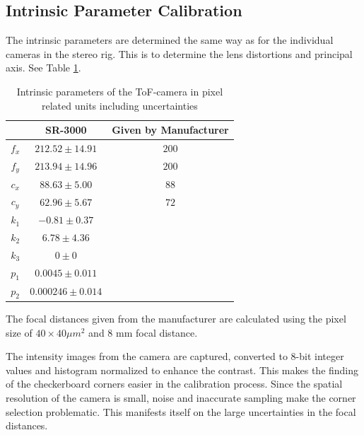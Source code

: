 \subsection{Intrinsic Parameter Calibration}
The intrinsic parameters are determined the same way as for the individual cameras in the
stereo rig. This is to determine the lens distortions and principal axis. See Table
\ref{chap3:tab-intrinsic-sr3000}.
\begin{table}[htbp]
  \centering
    \begin{tabular}{|c|c|c|} 
        \hline
                & SR-3000       & Given by Manufacturer \\
        \hline
        $f_x$   & $212.52 \pm 14.91 $  & $200$  \\
        $f_y$   & $213.94 \pm 14.96 $  & $200$  \\
        \hline
        $c_x$   & $88.63 \pm 5.00$  & $88$ \\
        $c_y$   & $ 62.96 \pm 5.67 $ & $72$  \\
        \hline
        $k_1$   & $-0.81 \pm 0.37$ & \\ 
        $k_2$   & $6.78 \pm 4.36$  & \\
        $k_3$   & $0 \pm 0$ & \\
        \hline
        $p_1$   & $0.0045 \pm 0.011$ & \\
        $p_2$   & $0.000246 \pm 0.014$ \\
        \hline
    \end{tabular}
    \caption{Intrinsic parameters of the ToF-camera in pixel related units including
    uncertainties}
    \label{chap3:tab-intrinsic-sr3000}
\end{table}
The focal distances given from the manufacturer are calculated using the pixel size of
$40 \times 40 \mu m^2$ and 8 mm focal distance.

The intensity images from
the camera are captured, converted to 8-bit integer values and histogram normalized to
enhance the contrast. This makes the finding of the checkerboard corners easier in
the calibration process. Since the spatial resolution of the camera is small, noise and
inaccurate sampling make the corner selection problematic. This manifests itself on the large
uncertainties in the focal distances. 

